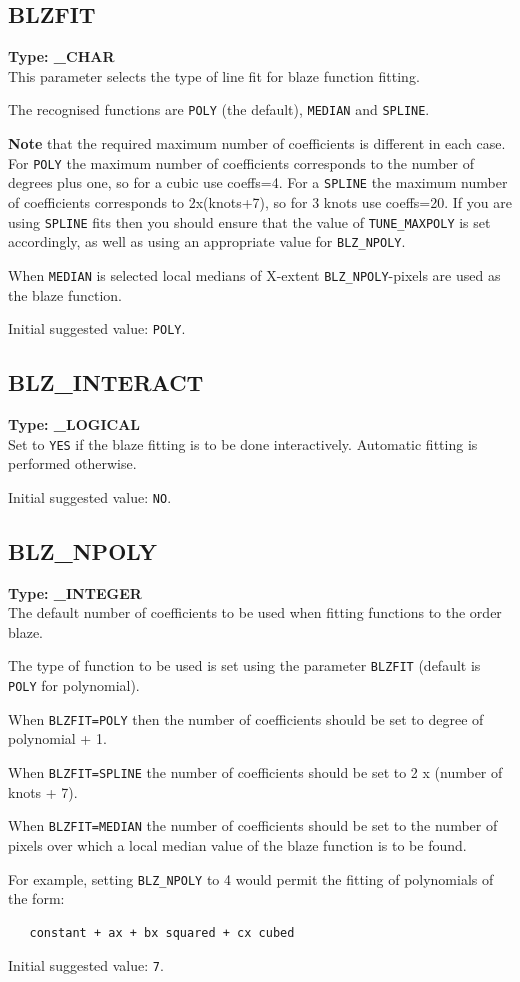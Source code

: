 \documentclass[11pt,twoside]{article}
\makeatletter
\newcommand{\htmlref}[2]{#1}
\newcommand{\xlabel}[1]{}
\newcommand{\sunspec}[2]{#1}
\renewcommand{\sunspec}[2]{#2}
\newcommand{\indexcmdname}[1]{\index{#1@\protect\cmdname{#1}}}
\renewcommand{\indexcmdname}[1]{}
\newcommand{\cmdname}{\begingroup \catcode`\_=12 \realcmdname}
\newcommand{\realcmdname}[1]{\endgroup\texttt{#1}}
\newcommand{\echparameter}[4]
{
\item [#1 = #3] \mbox{}\label{par_#2}\indexcmdname{#2}
\\
#4
}
\renewcommand{\echparameter}[4]
{
  \subsection{\xlabel{par_#2}\label{par_#2}{\bf #1}}
  {\bf Type: #3}\\
#4
}
\makeatother
\begin{document}
\echparameter{BLZFIT}{BLZFIT}{
 \_CHAR
}{
 This parameter selects the type of line fit for blaze function
 fitting.

 The recognised functions are \texttt{POLY} (the default), \texttt{MEDIAN}
 and \texttt{SPLINE}.

 {\bf Note} that the required maximum number of coefficients is
 different in each case.  For \texttt{POLY} the maximum number of coefficients
 corresponds to the number of degrees plus one, so for a cubic use coeffs=4.
 For a \texttt{SPLINE} the maximum number of coefficients corresponds to
 \sunspec{(knots+7)$\times$2}{2x(knots+7)}, so for 3 knots use coeffs=20.
 If you are using
 \texttt{SPLINE} fits then you should ensure that the value of
 \htmlref{{\tt TUNE\_MAXPOLY}}{par_TUNE_MAXPOLY} is set accordingly, as
 well as using an appropriate value for
 \htmlref{{\tt BLZ\_NPOLY}}{par_BLZ_NPOLY}.

 When \texttt{MEDIAN} is selected local medians of X-extent
 \htmlref{{\tt BLZ\_NPOLY}}{par_BLZ_NPOLY}-pixels are used as the blaze
 function.

 Initial suggested value: \texttt{POLY}.
}

\echparameter{BLZ\_INTERACT}{BLZ_INTERACT}{
 \_LOGICAL
}{
 Set to \texttt{YES} if the blaze fitting is to be done interactively.
 Automatic fitting is performed otherwise.

 Initial suggested value: \texttt{NO}.
}

\echparameter{BLZ\_NPOLY}{BLZ_NPOLY}{
 \_INTEGER
}{
 The default number of coefficients to be used when fitting functions
 to the order blaze.

 The type of function to be used is set using the parameter
 \htmlref{\texttt{BLZFIT}}{par_BLZFIT}
 (default is \texttt{POLY} for polynomial).

 When \texttt{BLZFIT=POLY} then the number of coefficients should be set to
 degree of polynomial + 1.

 When \texttt{BLZFIT=SPLINE} the number of coefficients should be set to
 \sunspec{(number of knots + 7)$\times$2}{2 x (number of knots + 7)}.

 When \texttt{BLZFIT=MEDIAN} the number of coefficients should be set to the
 number of pixels over which a local median value of the blaze function
 is to be found.

 For example, setting {\tt BLZ\_NPOLY} to 4 would permit the fitting of
 polynomials of the form:

\sunspec{
 ${\rm constant} + ax + bx^{2} + cx^{3}$.
}{
\begin{verbatim}
   constant + ax + bx squared + cx cubed
\end{verbatim}
}

 Initial suggested value: \texttt{7}.
}
\end{document}
